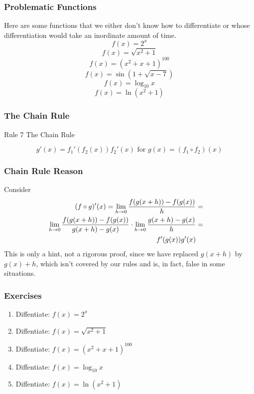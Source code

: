 \documentclass[xcolor=dvipsnames,handout]{beamer}
\begin{document}
\begin{frame}
  \frametitle{Problematic Functions}
Here are some functions that we either don't know how to differentiate
or whose differentiation would take an inordinate amount of time.
\begin{equation}
  \label{eq:faegeehi}
f(x)=2^{x}
\end{equation}
\begin{equation}
  \label{eq:kooteiju}
f(x)=\sqrt{x^{2}+1}
\end{equation}
\begin{equation}
  \label{eq:oochahph}
f(x)=(x^{2}+x+1)^{100}
\end{equation}
\begin{equation}
  \label{eq:bongaeza}
f(x)=\sin(1+\sqrt{x-7})
\end{equation}
\begin{equation}
  \label{eq:ooquonge}
f(x)=\log_{10}x
\end{equation}
\begin{equation}
  \label{eq:iejafaic}
f(x)=\ln(x^{2}+1)
\end{equation}
\end{frame}

\begin{frame}
  \frametitle{The Chain Rule}
  \begin{block}{Rule 7}
The Chain Rule
  \end{block}
\begin{equation}
  \label{eq:aepuaxai}
g'(x)=f_{1}'(f_{2}(x))f_{2}'(x)\mbox{ for }g(x)=(f_{1}\circ{}f_{2})(x)
\end{equation}
\end{frame}

\begin{frame}
  \frametitle{Chain Rule Reason}
Consider
\begin{align}
  \label{eq:prf}
  (f\circ{}g)'(x)=\lim_{h\rightarrow{}0}\frac{f(g(x+h))-f(g(x))}{h}&=&\notag \\
  \lim_{h\rightarrow{}0}\frac{f(g(x+h))-f(g(x))}{g(x+h)-g(x)}\cdot\lim_{h\rightarrow{}0}\frac{g(x+h)-g(x)}{h}&=& \\
  f'(g(x))g'(x)&&
\end{align}
This is only a hint, not a rigorous proof, since we have replaced
$g(x+h)$ by $g(x)+h$, which isn't covered by our rules and is, in
fact, false in some situations.
\end{frame}

\begin{frame}
  \frametitle{Exercises}
  \begin{enumerate}
  \item<1-> Diffentiate: $f(x)=2^{x}$
  \item<2-> Diffentiate: $f(x)=\sqrt{x^{2}+1}$
  \item<3-> Diffentiate: $f(x)=(x^{2}+x+1)^{100}$
  \item<4-> Diffentiate: $f(x)=\log_{10}x$
  \item<5-> Diffentiate: $f(x)=\ln(x^{2}+1)$
  \end{enumerate}
\end{frame}
\end{document}
